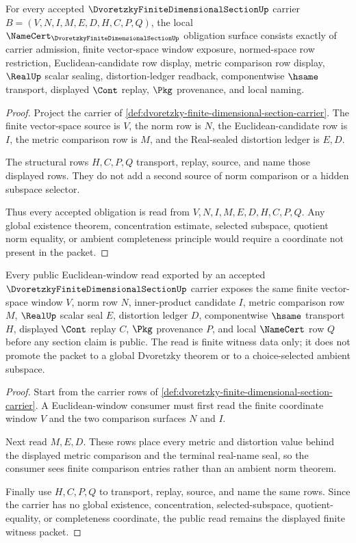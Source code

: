 \begin{theorem}
\label{thm:dvoretzky-finite-dimensional-section-namecert-obligations}
For every accepted $\DvoretzkyFiniteDimensionalSectionUp$ carrier $B=(V,N,I,M,E,D,H,C,P,Q)$, the local $\NameCert_{\DvoretzkyFiniteDimensionalSectionUp}$ obligation surface consists exactly of carrier admission, finite vector-space window exposure, normed-space row restriction, Euclidean-candidate row display, metric comparison row display, $\RealUp$ scalar sealing, distortion-ledger readback, componentwise $\hsame$ transport, displayed $\Cont$ replay, $\Pkg$ provenance, and local naming.
\end{theorem}
\begin{proof}
Project the carrier of \autoref{def:dvoretzky-finite-dimensional-section-carrier}. The finite vector-space source is $V$, the norm row is $N$, the Euclidean-candidate row is $I$, the metric comparison row is $M$, and the Real-sealed distortion ledger is $E,D$.

The structural rows $H,C,P,Q$ transport, replay, source, and name those displayed rows. They do not add a second source of norm comparison or a hidden subspace selector.

Thus every accepted obligation is read from $V,N,I,M,E,D,H,C,P,Q$. Any global existence theorem, concentration estimate, selected subspace, quotient norm equality, or ambient completeness principle would require a coordinate not present in the packet.
\end{proof}

\begin{theorem}
\label{thm:dvoretzky-finite-dimensional-section-euclidean-window}
Every public Euclidean-window read exported by an accepted $\DvoretzkyFiniteDimensionalSectionUp$ carrier exposes the same finite vector-space window $V$, norm row $N$, inner-product candidate $I$, metric comparison row $M$, $\RealUp$ scalar seal $E$, distortion ledger $D$, componentwise $\hsame$ transport $H$, displayed $\Cont$ replay $C$, $\Pkg$ provenance $P$, and local $\NameCert$ row $Q$ before any section claim is public. The read is finite witness data only; it does not promote the packet to a global Dvoretzky theorem or to a choice-selected ambient subspace.
\end{theorem}
\begin{proof}
Start from the carrier rows of \autoref{def:dvoretzky-finite-dimensional-section-carrier}. A Euclidean-window consumer must first read the finite coordinate window $V$ and the two comparison surfaces $N$ and $I$.

Next read $M,E,D$. These rows place every metric and distortion value behind the displayed metric comparison and the terminal real-name seal, so the consumer sees finite comparison entries rather than an ambient norm theorem.

Finally use $H,C,P,Q$ to transport, replay, source, and name the same rows. Since the carrier has no global existence, concentration, selected-subspace, quotient-equality, or completeness coordinate, the public read remains the displayed finite witness packet.
\end{proof}

